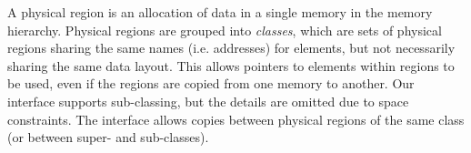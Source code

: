 A physical region is an allocation of data in a single memory in the memory hierarchy.  Physical
regions are grouped into {\em classes}, which are sets of physical regions sharing the
same names (i.e. addresses) for elements, but not necessarily sharing the same data layout.  This
allows pointers to elements within regions to be used, even if the regions are copied from one memory
to another.  Our
interface supports sub-classing, but the details are omitted due to space constraints.  The
interface allows copies between physical regions of
the same class (or between super- and sub-classes).  



